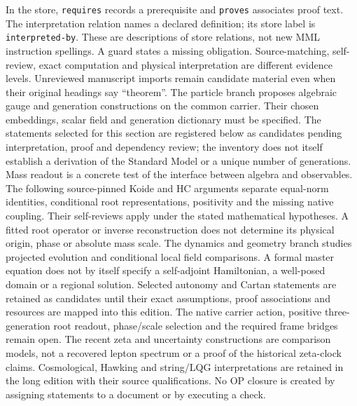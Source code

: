 In the store, \texttt{requires} records a prerequisite and
\texttt{proves} associates proof text. The interpretation relation names
a declared definition; its store label is \texttt{interpreted-by}.
These are descriptions of store relations, not
new MML instruction spellings. A guard states a missing obligation.
Source-matching, self-review, exact computation and physical interpretation
are different evidence levels. Unreviewed manuscript imports remain
candidate material even when their original headings say ``theorem''.
The particle branch proposes algebraic gauge and generation constructions
on the common carrier. Their chosen embeddings, scalar field and generation
dictionary must be specified. The statements selected for this section
are registered below as candidates pending interpretation, proof and
dependency review; the inventory does not itself establish a derivation
of the Standard Model or a unique number of generations.
Mass readout is a concrete test of the interface between algebra and
observables. The following source-pinned Koide and HC arguments separate
equal-norm identities, conditional root representations, positivity and
the missing native coupling. Their self-reviews apply under the stated
mathematical hypotheses. A fitted root operator or inverse reconstruction
does not determine its physical origin, phase or absolute mass scale.
The dynamics and geometry branch studies projected evolution and
conditional local field comparisons. A formal master equation does not
by itself specify a self-adjoint Hamiltonian, a well-posed domain or a
regional solution. Selected autonomy and Cartan statements are retained
as candidates until their exact assumptions, proof associations and
resources are mapped into this edition.
The native carrier action, positive three-generation root readout,
phase/scale selection and the required frame bridges remain open.
The recent zeta and uncertainty constructions are comparison models,
not a recovered lepton spectrum or a proof of the historical zeta-clock
claims. Cosmological, Hawking and string/LQG interpretations are retained
in the long edition with their source qualifications. No OP closure is
created by assigning statements to a document or by executing a check.

